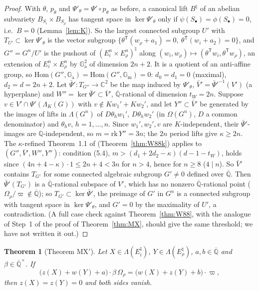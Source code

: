 \documentclass[11pt]{amsart}
\newtheorem{theorem}{Theorem}[section]
\theoremstyle{definition}
\newcommand{\Qb}{\overline{\mathbb{Q}}}
\newcommand{\C}{\mathbb{C}}
\newcommand{\Q}{\mathbb{Q}}
\newcommand{\Ga}{\mathbb{G}_{\mathrm a}}
\newcommand{\Gm}{\mathbb{G}_{\mathrm m}}
\newcommand{\vp}{\varpi}
\begin{document}
\begin{proof}
With $\theta$, $p_\theta$ and $\Psi'_\theta=\Psi'\circ p_\theta$ as before, a canonical lift $B^\natural$ of an abelian
subvariety $B_{S_i}\times B_{S_\rho}$ has tangent space in $\ker\Psi'_\theta$ only if $\psi(S_\bullet)=\phi(S_\bullet)=0$, i.e.\
$B=0$ (Lemma~\ref{lem:K}). So the largest connected subgroup $U'$ with $T_{U'}\subset\ker\Psi'_\theta$ is the vector subgroup
$\{\theta^{\mathsf T}(w_\rho+a_1)=0,\ \theta^{\mathsf T}(w_i+a_2)=0\}$, and $G''=G^n/U'$ is the pushout of
$(E_i^n\times E_\rho^n)^\natural$ along $(w_i,w_\rho)\mapsto(\theta^{\mathsf T}w_i,\theta^{\mathsf T}w_\rho)$, an extension of
$E_i^n\times E_\rho^n$ by $\Ga^2$ of dimension $2n+2$. It is a quotient of an anti-affine group, so
$\mathrm{Hom}(G'',\Ga)=\mathrm{Hom}(G'',\Gm)=0$: $d_0=d_1=0$ (maximal), $d_2=d=2n+2$. Let $\bar\Psi'\colon T_{G''}\to\C^2$
be the map induced by $\Psi'_\theta$, $\bar V'=\bar\Psi'^{-1}(V')$ (a hyperplane) and $W''=\ker\bar\Psi'\subset\bar V'$,
$\Qb$-rational of dimension $t_W=2n$. Suppose $v\in V'\cap\Psi'(\Lambda_K(G))$ with $v\notin Kw_1'+Kw_2'$, and let $Y''\subset\bar V'$
be generated by the images of lifts in $\Lambda(G^n)$ of $D\theta_hw_1'$, $D\theta_hw_2'$ (in $\Omega(G^n)$, $D$ a common
denominator) and $\theta_hv$, $h=1,\dots,n$. Since $w_1',w_2',v$ are $K$-independent, their $\bar\Psi'$-images are
$\Q$-independent, so $m=\mathrm{rk}\,Y''=3n$; the $2n$ period lifts give $\kappa\ge2n$. The $\kappa$-refined Theorem~1.1
of \cite[\S5d]{W88} (Theorem~\ref{thm:W88k}) applies to $(G'',\bar V',W'',Y'')$: condition (5.4),
$m>(d_1+2d_2-\kappa)(d-1-t_W)$, holds since $(4n+4-\kappa)\cdot1\le2n+4<3n$ for $n>4$, hence for $n\ge8$ ($4\mid n$). So
$\bar V'$ contains $T_{G'}$ for some connected algebraic subgroup $G'\ne0$ defined over $\Qb$. Then $\bar\Psi'(T_{G'})$ is a
$\Qb$-rational subspace of $V'$, which has no nonzero $\Qb$-rational point ($\Omega_\rho/\vp\notin\Qb$); so
$T_{G'}\subset\ker\bar\Psi'$, the preimage of $G'$ in $G^n$ is a connected subgroup with tangent space in
$\ker\Psi'_\theta$, and $G'=0$ by the maximality of $U'$, a contradiction. (A full case check against
Theorem~\ref{thm:W88}, with the analogue of Step~1 of the proof of Theorem~\ref{thm:MX}, should give the same threshold; we
have not written it out.)
\end{proof}

\begin{theorem}[Theorem MX$'$]\label{thm:MXP}
Let $X\in\Lambda(E_i^\natural)$, $Y\in\Lambda(E_\rho^\natural)$, $a,b\in\Qb$ and $\beta\in\Qb^\times$. If
\[
\bigl(z(X)+w(Y)+a\bigr)\cdot\beta\,\Omega_\rho=\bigl(w(X)+z(Y)+b\bigr)\cdot\vp ,
\]
then $z(X)=z(Y)=0$ and both sides vanish.
\end{theorem}
\end{document}
